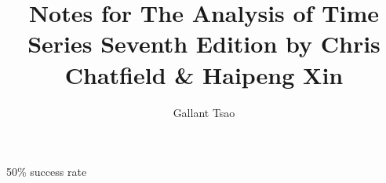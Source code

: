 \documentclass{notetemplate}
\title{Notes for The Analysis of Time Series Seventh Edition by Chris Chatfield \& Haipeng Xin}
\author{Gallant Tsao}
\begin{document}
\begin{titlingpage}
\maketitle
\end{titlingpage}

\newpage
\begin{theorem*}
50\% success rate
\end{theorem*}
\end{document}
